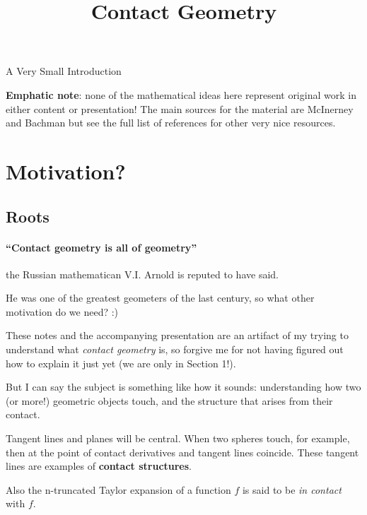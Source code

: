 \documentclass{article}
\begin{document}
\title {Contact Geometry}
\maketitle

\centerline{\sc \large A Very Small Introduction }
\onehalfspace

\tableofcontents

\newpage

\textbf{Emphatic note}: none of the mathematical ideas here represent original work in
either content or presentation! The main sources for the material are McInerney
\cite{mcinerney} and Bachman \cite{bachman} but see the full list of references for other very nice resources.

\newpage

\section { Motivation?}

\subsection {Roots}

\paragraph{``Contact geometry is all of geometry''} the Russian mathematican
V.I. Arnold is reputed to have said.

He was one of the greatest geometers of the last century, so what other
motivation do we need? :)

These notes and the accompanying presentation are an artifact of my trying to
understand what \textsl{contact geometry} is, so forgive me for not having
figured out how to explain it just yet (we are only in Section 1!).

But I can say the subject is something like how it sounds: understanding how two
(or more!) geometric objects touch, and the structure that arises from their contact.

Tangent lines and planes will be central. When two spheres touch, for example,
then at the point of contact derivatives and tangent lines coincide. These tangent
lines are examples of \textbf{contact structures}.

Also the n-truncated Taylor expansion of a function $f$ is said to be \textsl{in
  contact} with $f$.
\end{document}
